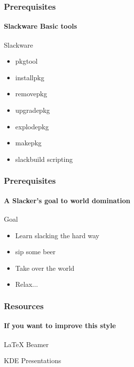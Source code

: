 \documentclass[12pt]{beamer}
\begin{document}
\begin{frame}
  \frametitle{Prerequisites}
  \framesubtitle{Slackware Basic tools}
  \begin{block}{Slackware}
  \begin{itemize}
    \item<1-> pkgtool
    \item<2-> installpkg
    \item<3-> removepkg
    \item<4-> upgradepkg
    \item<5-> explodepkg
    \item<6-> makepkg
    \item<7-> slackbuild scripting
  \end{itemize}
  \end{block}
\end{frame}

\begin{frame}
  \frametitle{Prerequisites}
  \framesubtitle{A Slacker's goal to world domination}
  \begin{block}{Goal}
  \begin{itemize}
    \item Learn slacking the hard way
    \item sip some beer
    \item Take over the world
    \item Relax...
  \end{itemize}
  \end{block}
\end{frame}




\begin{frame}
  \frametitle{Resources}
  \framesubtitle{If you want to improve this style}
  \begin{thebibliography}{10}

  \beamertemplatearticlebibitems

    LaTeX Beamer

    KDE Presentations

  \end{thebibliography}
\end{frame}


\end{document}
